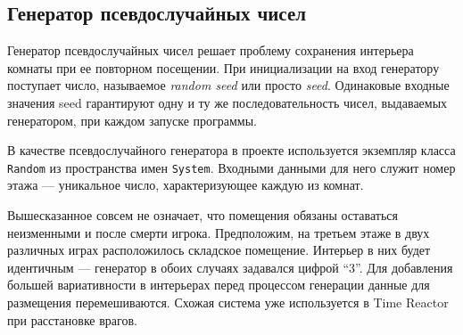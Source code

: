 \subsection{Генератор псевдослучайных чисел}

Генератор псевдослучайных чисел решает проблему сохранения интерьера комнаты при ее повторном посещении. При инициализации на вход генератору поступает число, называемое \textit{random seed} или просто \textit{seed}. Одинаковые входные значения seed гарантируют одну и ту же последовательность чисел, выдаваемых генератором, при каждом запуске программы. 

В качестве псевдослучайного генератора в проекте используется экземпляр класса \texttt{Random} из пространства имен \texttt{System}. Входными данными для него служит номер этажа --- уникальное число, характеризующее каждую из комнат.

Вышесказанное совсем не означает, что помещения обязаны оставаться неизменными и после смерти игрока. Предположим, на третьем этаже в двух различных играх расположилось складское помещение. Интерьер в них будет идентичным --- генератор в обоих случаях задавался цифрой \enquote{3}. Для добавления большей вариативности в интерьерах перед процессом генерации данные для размещения перемешиваются. Схожая система уже используется в Time Reactor при расстановке врагов.
 